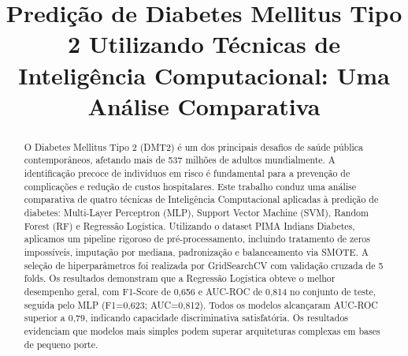 \documentclass[conference]{IEEEtran}
\begin{document}
\title{Predi\c{c}\~ao de Diabetes Mellitus Tipo 2 Utilizando T\'{e}cnicas de Intelig\^{e}ncia Computacional: Uma An\'{a}lise Comparativa}

\author{
\and
{}
\and
{}
}

\maketitle

\begin{abstract}
O Diabetes Mellitus Tipo 2 (DMT2) \'{e} um dos principais desafios de sa\'{u}de p\'{u}blica contempor\^{a}neos, afetando mais de 537 milh\~oes de adultos mundialmente. A identifica\c{c}\~ao precoce de indiv\'{i}duos em risco \'{e} fundamental para a preven\c{c}\~ao de complica\c{c}\~oes e redu\c{c}\~ao de custos hospitalares. Este trabalho conduz uma an\'{a}lise comparativa de quatro t\'{e}cnicas de Intelig\^{e}ncia Computacional aplicadas \`{a} predi\c{c}\~ao de diabetes: Multi-Layer Perceptron (MLP), Support Vector Machine (SVM), Random Forest (RF) e Regress\~ao Log\'{i}stica. Utilizando o dataset PIMA Indians Diabetes, aplicamos um pipeline rigoroso de pr\'{e}-processamento, incluindo tratamento de zeros imposs\'{i}veis, imputa\c{c}\~ao por mediana, padroniza\c{c}\~ao e balanceamento via SMOTE. A sele\c{c}\~ao de hiperpar\^{a}metros foi realizada por GridSearchCV com valida\c{c}\~ao cruzada de 5 folds. Os resultados demonstram que a Regress\~ao Log\'{i}stica obteve o melhor desempenho geral, com F1-Score de 0,656 e AUC-ROC de 0,814 no conjunto de teste, seguida pelo MLP (F1=0,623; AUC=0,812). Todos os modelos alcan\c{c}aram AUC-ROC superior a 0,79, indicando capacidade discriminativa satisfat\'{o}ria. Os resultados evidenciam que modelos mais simples podem superar arquiteturas complexas em bases de pequeno porte.
\end{abstract}
\end{document}
